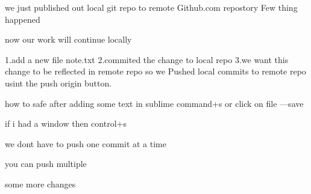 we just published out local git repo
to remote Github.com repostory
Few thing happened 



now our work will continue locally

1.add a new file note.txt
2.commited the change to local repo
3.we want this change to be reflected in remote
repo so we Pushed local commits to remote repo usint the push origin button.


how to safe after adding some text in sublime
command+s
or click on file ---save

if i had a window then control+s

we dont have to push one commit at a time

you can push multiple 

some more changes